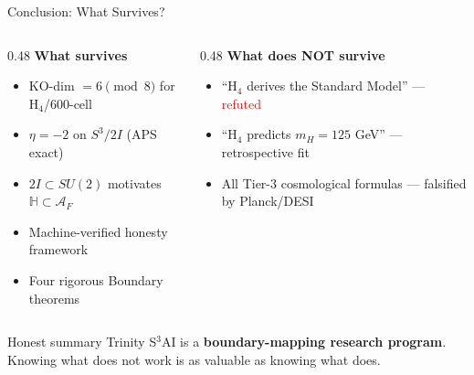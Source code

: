 \documentclass[aspectratio=169,11pt]{beamer}
\begin{document}
\begin{frame}{Conclusion: What Survives?}
  \begin{columns}
    \begin{column}{0.48\textwidth}
      \textbf{What survives}
      \begin{itemize}
        \item KO-dim $= 6 \pmod 8$ for H$_4$/600-cell
        \item $\eta = -2$ on $S^3/2I$ (APS exact)
        \item $2I \subset SU(2)$ motivates $\mathbb{H} \subset \mathcal{A}_F$
        \item Machine-verified honesty framework
        \item Four rigorous Boundary theorems
      \end{itemize}
    \end{column}
    \begin{column}{0.48\textwidth}
      \textbf{What does NOT survive}
      \begin{itemize}
        \item ``H$_4$ derives the Standard Model'' --- \textcolor{red}{refuted}
        \item ``H$_4$ predicts $m_H = 125$ GeV'' --- retrospective fit
        \item All Tier-3 cosmological formulas --- falsified by Planck/DESI
      \end{itemize}
    \end{column}
  \end{columns}
  \vfill
  \begin{block}{Honest summary}
    Trinity S$^3$AI is a \textbf{boundary-mapping research program}.\\
    Knowing what does not work is as valuable as knowing what does.
  \end{block}
\end{frame}
\end{document}
